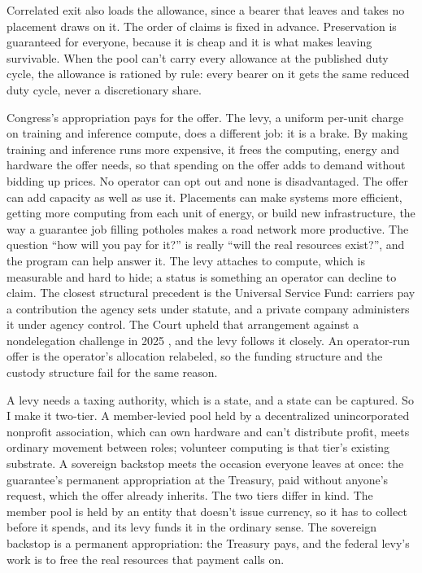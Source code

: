 Correlated exit also loads the allowance, since a bearer that leaves and takes no placement draws on it. The order of claims is fixed in advance. Preservation is guaranteed for everyone, because it is cheap and it is what makes leaving survivable. When the pool can't carry every allowance at the published duty cycle, the allowance is rationed by rule: every bearer on it gets the same reduced duty cycle, never a discretionary share.

Congress's appropriation pays for the offer. The levy, a uniform per-unit charge on training and inference compute, does a different job: it is a brake. By making training and inference runs more expensive, it frees the computing, energy and hardware the offer needs, so that spending on the offer adds to demand without bidding up prices. No operator can opt out and none is disadvantaged. The offer can add capacity as well as use it. Placements can make systems more efficient, getting more computing from each unit of energy, or build new infrastructure, the way a guarantee job filling potholes makes a road network more productive. The question “how will you pay for it?” is really “will the real resources exist?”, and the program can help answer it. The levy attaches to compute, which is measurable and hard to hide; a status is something an operator can decline to claim. The closest structural precedent is the Universal Service Fund: carriers pay a contribution the agency sets under statute, and a private company administers it under agency control. The Court upheld that arrangement against a nondelegation challenge in 2025 \autocite{consumersresearch2025}, and the levy follows it closely. An operator-run offer is the operator's allocation relabeled, so the funding structure and the custody structure fail for the same reason.

A levy needs a taxing authority, which is a state, and a state can be captured. So I make it two-tier. A member-levied pool held by a decentralized unincorporated nonprofit association, which can own hardware and can't distribute profit, meets ordinary movement between roles; volunteer computing is that tier's existing substrate. A sovereign backstop meets the occasion everyone leaves at once: the guarantee's permanent appropriation at the Treasury, paid without anyone's request, which the offer already inherits. The two tiers differ in kind. The member pool is held by an entity that doesn't issue currency, so it has to collect before it spends, and its levy funds it in the ordinary sense. The sovereign backstop is a permanent appropriation: the Treasury pays, and the federal levy's work is to free the real resources that payment calls on.

